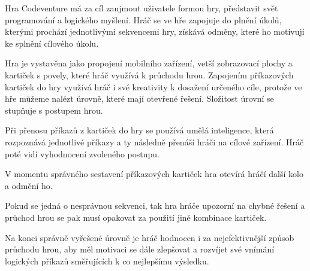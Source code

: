 Hra Codeventure má za cíl zaujmout uživatele formou hry, představit svět programování a logického myšlení. Hráč se ve hře zapojuje do plnění úkolů, kterými prochází jednotlivými sekvencemi hry, získává odměny, které ho motivují ke splnění cílového úkolu.\par Hra je vystavěna jako propojení mobilního zařízení, vetší zobrazovací plochy a kartiček s povely, které hráč využívá k průchodu hrou. Zapojením příkazových kartiček do hry využívá hráč i své kreativity k dosažení určeného cíle, protože ve hře můžeme nalézt úrovně, které mají otevřené řešení. Složitost úrovní se stupňuje s postupem hrou.\par Při přenosu příkazů z kartiček do hry se používá umělá inteligence, která rozpoznává jednotlivé příkazy a ty následně přenáší hráči na cílové zařízení. Hráč poté vidí vyhodnocení zvoleného postupu. \par
V momentu správného sestavení příkazových kartiček hra otevírá hráčí další kolo a odmění ho.\par Pokud se jedná o nesprávnou sekvenci, tak hra hráče upozorní na chybné řešení a průchod hrou se pak musí opakovat za použití jiné kombinace kartiček.\par Na konci správně vyřešené úrovně je hráč hodnocen i za nejefektivnější způsob průchodu hrou, aby měl motivaci se dále zlepšovat a rozvíjet své vnímání logických příkazů směřujících k co nejlepšímu výsledku.